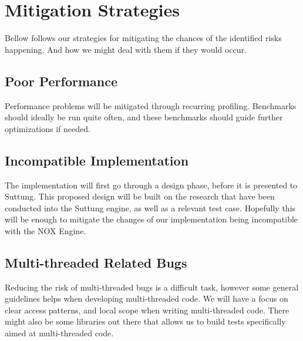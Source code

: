 \section*{Mitigation Strategies}
Bellow follows our strategies for mitigating the chances of the identified risks happening.
And how we might deal with them if they would occur.

\subsection*{Poor Performance}
Performance problems will be mitigated through recurring profiling.
Benchmarks should ideally be run quite often,
and these benchmarks should guide further optimizations if needed.

\subsection*{Incompatible Implementation}
The implementation will first go through a design phase,
before it is presented to Suttung. 
This proposed design will be built on the research
that have been conducted into the Suttung engine,
as well as a relevant test case.
Hopefully this will be enough to mitigate the changes
of our implementation being incompatible with the NOX Engine.

\subsection*{Multi-threaded Related Bugs}
Reducing the risk of multi-threaded bugs is a difficult task, 
however some general guidelines helps when developing multi-threaded code.
We will have a focus on clear access patterns,
and local scope when writing multi-threaded code.
There might also be some libraries out there that
allows us to build tests specifically aimed at
multi-threaded code.
